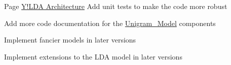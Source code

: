 \label{todo__todo000001}
\hypertarget{todo__todo000001}{}
 
\begin{DoxyDescription}
\item[Page \hyperlink{architecture}{Y!LDA Architecture} ]Add unit tests to make the code more robust 

Add more code documentation for the \hyperlink{class_unigram___model}{Unigram\_\-Model} components 

Implement fancier models in later versions 

Implement extensions to the LDA model in later versions


\end{DoxyDescription}